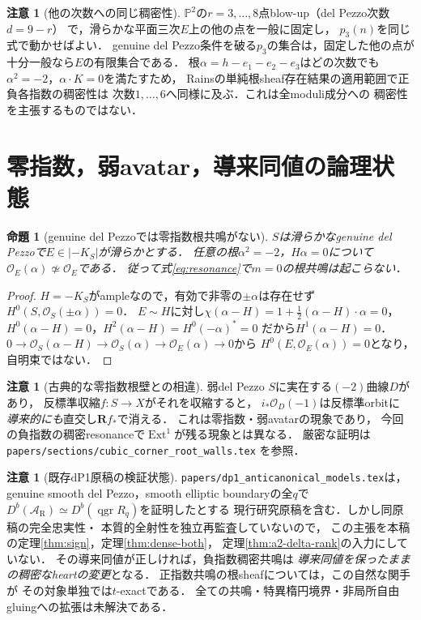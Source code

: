 \documentclass[11pt,a4paper]{ltjsarticle}
\newtheorem{proposition}[theorem]{命題}
\theoremstyle{definition}\newtheorem{remark}[theorem]{注意}
\DeclareMathOperator{\Ext}{Ext}
\DeclareMathOperator{\qgr}{qgr}
\newcommand{\Db}{D^b}
\begin{document}
\begin{remark}[他の次数への同じ稠密性]
$\mathbb P^2$の$r=3,\ldots,8$点blow-up（del Pezzo次数$d=9-r$）
で，滑らかな平面三次$E$上の他の点を一般に固定し，
$p_3(n)$を同じ式で動かせばよい．
genuine del Pezzo条件を破る$p_3$の集合は，固定した他の点が
十分一般なら$E$の有限集合である．
根$\alpha=h-e_1-e_2-e_3$はどの次数でも
$\alpha^2=-2$，$\alpha\cdot K=0$を満たすため，
Rainsの単純根sheaf存在結果の適用範囲で正負各指数の稠密性は
次数$1,\ldots,6$へ同様に及ぶ．これは全moduli成分への
稠密性を主張するものではない．
\end{remark}






\section{零指数，弱avatar，導来同値の論理状態}
\begin{proposition}[genuine del Pezzoでは零指数根共鳴がない]
\label{prop:zero-index}
$S$は滑らかなgenuine del Pezzoで$E\in|-K_S|$が滑らかとする．
任意の根$\alpha^2=-2$，$H\alpha=0$について
$\mathcal O_E(\alpha)\not\simeq\mathcal O_E$である．
従って式\eqref{eq:resonance}で$m=0$の根共鳴は起こらない．
\end{proposition}
\begin{proof}
$H=-K_S$がampleなので，有効で非零の$\pm\alpha$は存在せず
$H^0(S,\mathcal O_S(\pm\alpha))=0$．
$E\sim H$に対し$\chi(\alpha-H)=
1+\frac12(\alpha-H)\cdot\alpha=0$，
$H^0(\alpha-H)=0$，$H^2(\alpha-H)=H^0(-\alpha)^*=0$
だから$H^1(\alpha-H)=0$．
$0\to\mathcal O_S(\alpha-H)\to\mathcal O_S(\alpha)
\to\mathcal O_E(\alpha)\to0$から
$H^0(E,\mathcal O_E(\alpha))=0$となり，自明束ではない．
\end{proof}
\begin{remark}[古典的な零指数根壁との相違]
弱del Pezzo $S$に実在する$(-2)$曲線$D$があり，
反標準収縮$f:S\to X$がそれを収縮すると，
$i_*\mathcal O_D(-1)$は反標準orbitに
\emph{導来的にも}直交し$\mathbf Rf_*$で消える．
これは零指数・弱avatarの現象であり，
今回の負指数の稠密resonanceで$\Ext^1$が残る現象とは異なる．
厳密な証明は\texttt{papers/sections/cubic\_corner\_root\_walls.tex}
を参照．
\end{remark}

\begin{remark}[既存dP1原稿の検証状態]
\texttt{papers/dp1\_anticanonical\_models.tex}は，
genuine smooth del Pezzo，smooth elliptic boundaryの全$q$で
$\Db(\mathcal A_{\mathrm R})\simeq\Db(\qgr R_q)$を証明したとする
現行研究原稿を含む．しかし同原稿の完全忠実性・
本質的全射性を独立再監査していないので，
この主張を本稿の定理\ref{thm:sign}，定理\ref{thm:dense-both}，
定理\ref{thm:a2-delta-rank}の入力にしていない．
その導来同値が正しければ，負指数稠密共鳴は
\emph{導来同値を保ったままの稠密なheartの変更}となる．
正指数共鳴の根sheafについては，この自然な関手が
その対象単独では$t$-exactである．
全ての共鳴・特異楕円境界・非局所自由gluingへの拡張は未解決である．
\end{remark}
\end{document}
